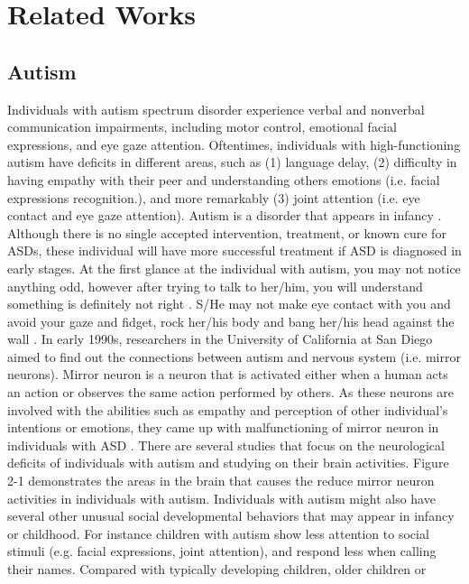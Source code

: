 \chapter{Related Works}

\section{Autism}
Individuals with autism spectrum disorder experience verbal and nonverbal
communication impairments, including motor control, emotional facial expressions, and
eye gaze attention. Oftentimes, individuals with high-functioning autism have deficits in
different areas, such as (1) language delay, (2) difficulty in having empathy with their peer
and understanding others emotions (i.e. facial expressions recognition.), and more
remarkably (3) joint attention (i.e. eye contact and eye gaze attention). Autism is a disorder
that appears in infancy \cite{Epidemiology1966}. Although there is no single accepted intervention, treatment,
or known cure for ASDs, these individual will have more successful treatment if ASD is
diagnosed in early stages. At the first glance at the individual with autism, you may not
notice anything odd, however after trying to talk to her/him, you will understand something
is definitely not right \cite{BrokenMirror2006}. S/He may not make eye contact with you and avoid your gaze
and fidget, rock her/his body and bang her/his head against the wall \cite{BrokenMirror2006}.
In early 1990s, researchers in the University of California at San Diego aimed to
find out the connections between autism and nervous system (i.e. mirror neurons). Mirror
neuron \cite{BrokenMirror2006} is a neuron that is activated either when a human acts an action or observes the
same action performed by others. As these neurons are involved with the abilities such as
empathy and perception of other individual’s intentions or emotions, they came up with 
malfunctioning of mirror neuron in individuals with ASD \cite{BrokenMirror2006}. There are several studies
that focus on the neurological deficits of individuals with autism and studying on their
brain activities. Figure 2-1 demonstrates the areas in the brain that causes the reduce mirror
neuron activities in individuals with autism.
Individuals with autism might also have several other unusual social developmental
behaviors that may appear in infancy or childhood. For instance children with autism show
less attention to social stimuli (e.g. facial expressions, joint attention), and respond less
when calling their names. Compared with typically developing children, older children or
